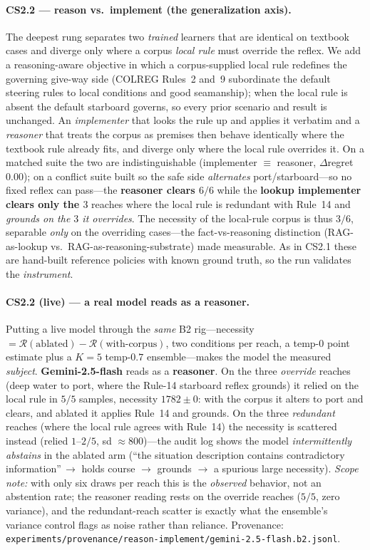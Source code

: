 \documentclass{article}
\newcommand{\regret}{\mathcal{R}}
\begin{document}
\paragraph{CS2.2 --- reason vs.\ implement (the generalization axis).} The deepest rung separates two
\emph{trained} learners that are identical on textbook cases and diverge only where a corpus \emph{local
rule} must override the reflex. We add a reasoning-aware objective in which a corpus-supplied local rule
redefines the governing give-way side (COLREG Rules~2 and~9 subordinate the default steering rules to
local conditions and good seamanship); when the local rule is absent the default starboard governs, so
every prior scenario and result is unchanged. An \emph{implementer} that looks the rule up and applies it
verbatim and a \emph{reasoner} that treats the corpus as premises then behave identically where the
textbook rule already fits, and diverge only where the local rule overrides it. On a matched suite the two
are indistinguishable (implementer $\equiv$ reasoner, $\Delta$regret $0.00$); on a conflict suite built so
the safe side \emph{alternates} port/starboard---so no fixed reflex can pass---the \textbf{reasoner clears
$6/6$} while the \textbf{lookup implementer clears only the $3$} reaches where the local rule is redundant
with Rule~14 and \emph{grounds on the $3$ it overrides}. The necessity of the local-rule corpus is thus
$3/6$, separable \emph{only} on the overriding cases---the fact-vs-reasoning distinction (RAG-as-lookup
vs.\ RAG-as-reasoning-substrate) made measurable. As in CS2.1 these are hand-built reference policies
with known ground truth, so the run validates the \emph{instrument}.

\paragraph{CS2.2 (live) --- a real model reads as a reasoner.} Putting a live model through the \emph{same}
B2 rig---necessity $=\regret(\text{ablated})-\regret(\text{with-corpus})$, two conditions per reach, a
temp-$0$ point estimate plus a $K{=}5$ temp-$0.7$ ensemble---makes the model the measured \emph{subject}.
\textbf{Gemini-2.5-flash} reads as a \textbf{reasoner}. On the three \emph{override} reaches (deep water
to port, where the Rule-14 starboard reflex grounds) it relied on the local rule in $5/5$ samples,
necessity $1782\pm0$: with the corpus it alters to port and clears, and ablated it applies Rule~14 and
grounds. On the three \emph{redundant} reaches (where the local rule agrees with Rule~14) the necessity is
scattered instead (relied $1$--$2/5$, sd $\approx\!800$)---the audit log shows the model
\emph{intermittently abstains} in the ablated arm (``the situation description contains contradictory
information''\,$\to$ holds course $\to$ grounds $\to$ a spurious large necessity). \emph{Scope note:} with
only six draws per reach this is the \emph{observed} behavior, not an abstention rate; the reasoner
reading rests on the override reaches ($5/5$, zero variance), and the redundant-reach scatter is exactly
what the ensemble's variance control flags as noise rather than reliance. Provenance:
\texttt{experiments/provenance/reason-implement/gemini-2.5-flash.b2.jsonl}.
\end{document}
